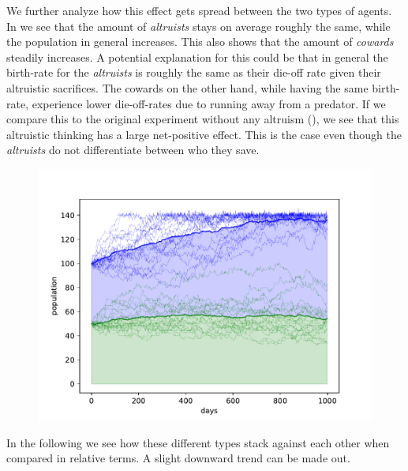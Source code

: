 \documentclass[sigconf]{acmart}
\newcommand{\todo}[1]{{\color{red}{#1}}}
\newcommand{\cowards}{\textit{cowards}\xspace}
\newcommand{\altruists}{\textit{altruists}\xspace}
\begin{document}
    We further analyze how this effect gets spread between the two types of agents.
    In  we see that the amount of \altruists stays on average roughly the same, while the population in general increases.
    This also shows that the amount of \cowards steadily increases.
    A potential explanation for this could be that in general the birth-rate for the \altruists is roughly the same as their die-off rate given their altruistic sacrifices.
    The cowards on the other hand, while having the same birth-rate, experience lower die-off-rates due to running away from a predator.
    If we compare this to the original experiment without any altruism (), we see that this altruistic thinking has a large net-positive effect.
    This is the case even though the \altruists do not differentiate between who they save.
    \todo{play around with settings so that they do die out and the following experiment makes more sense}

    \begin{figure}
        \includegraphics[width=\columnwidth]{figures/alt_cow_increase_separated}
        \caption{\todo{}}
        \label{fig:alt_cow_separated}
    \end{figure}

    In the following  we see how these different types stack against each other when compared in relative terms.
    A slight downward trend can be made out.
\end{document}
